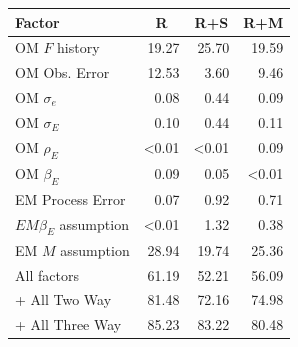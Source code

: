 \begin{center}
\begin{tabular}{lrrr}
\hline\hline
\multicolumn{1}{l}{Factor}&\multicolumn{1}{c}{R}&\multicolumn{1}{c}{R+S}&\multicolumn{1}{c}{R+M}\tabularnewline
\hline
OM $F$ history&19.27&25.70&19.59\tabularnewline
OM Obs. Error&12.53& 3.60& 9.46\tabularnewline
OM $\sigma_e$& 0.08& 0.44& 0.09\tabularnewline
OM $\sigma_E$& 0.10& 0.44& 0.11\tabularnewline
OM $\rho_{E}$&\textless  0.01&\textless  0.01& 0.09\tabularnewline
OM $\beta_{E}$& 0.09& 0.05&\textless  0.01\tabularnewline
EM Process Error& 0.07& 0.92& 0.71\tabularnewline
$EM \beta_{E}$ assumption&\textless  0.01& 1.32& 0.38\tabularnewline
EM $M$ assumption&28.94&19.74&25.36\tabularnewline
All factors&61.19&52.21&56.09\tabularnewline
+ All Two Way&81.48&72.16&74.98\tabularnewline
+ All Three Way&85.23&83.22&80.48\tabularnewline
\hline
\end{tabular}\end{center}
